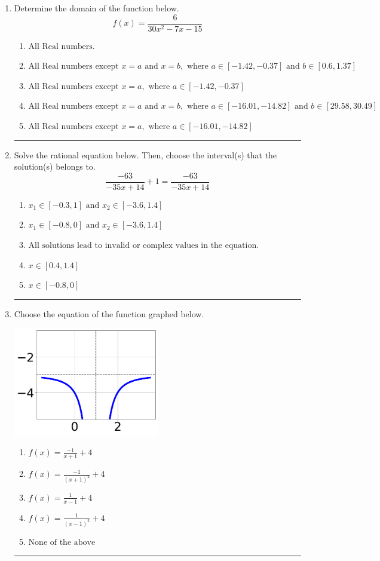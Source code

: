 \documentclass[14pt]{extbook}
\newcommand{\litem}[1]{\item#1\hspace*{-1cm}\rule{\textwidth}{0.4pt}}
\begin{document}
\begin{enumerate}
{\begin{enumerate}[label=\Alph*.]
\end{enumerate} }
\litem{
Determine the domain of the function below.\[ f(x) = \frac{6}{30x^{2} -7 x -15} \]\begin{enumerate}[label=\Alph*.]
\item \( \text{All Real numbers.} \)
\item \( \text{All Real numbers except } x = a \text{ and } x = b, \text{ where } a \in [-1.42, -0.37] \text{ and } b \in [0.6, 1.37] \)
\item \( \text{All Real numbers except } x = a, \text{ where } a \in [-1.42, -0.37] \)
\item \( \text{All Real numbers except } x = a \text{ and } x = b, \text{ where } a \in [-16.01, -14.82] \text{ and } b \in [29.58, 30.49] \)
\item \( \text{All Real numbers except } x = a, \text{ where } a \in [-16.01, -14.82] \)

\end{enumerate} }
\litem{
Solve the rational equation below. Then, choose the interval(s) that the solution(s) belongs to.\[ \frac{-63}{-35x + 14} + 1 = \frac{-63}{-35x + 14} \]\begin{enumerate}[label=\Alph*.]
\item \( x_1 \in [-0.3, 1] \text{ and } x_2 \in [-3.6,1.4] \)
\item \( x_1 \in [-0.8, 0] \text{ and } x_2 \in [-3.6,1.4] \)
\item \( \text{All solutions lead to invalid or complex values in the equation.} \)
\item \( x \in [0.4,1.4] \)
\item \( x \in [-0.8,0] \)

\end{enumerate} }
\litem{
Choose the equation of the function graphed below.
\begin{center}
    \includegraphics[width=0.5\textwidth]{../Figures/rationalGraphToEquationCopyC.png}
\end{center}
\begin{enumerate}[label=\Alph*.]
\item \( f(x) = \frac{-1}{x + 1} + 4 \)
\item \( f(x) = \frac{-1}{(x + 1)^2} + 4 \)
\item \( f(x) = \frac{1}{x - 1} + 4 \)
\item \( f(x) = \frac{1}{(x - 1)^2} + 4 \)
\item \( \text{None of the above} \)


\end{enumerate}}
\end{enumerate}
\end{document}
